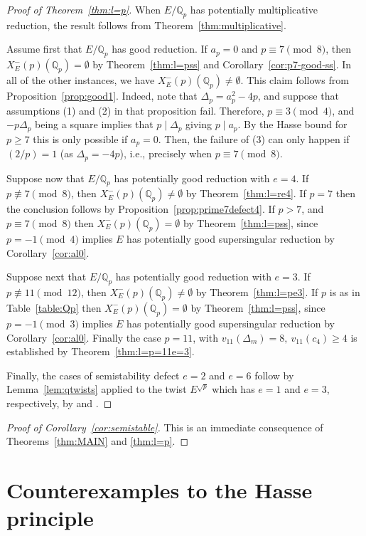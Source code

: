 \documentclass[12pt]{amsart}
\numberwithin{equation}{section}
\theoremstyle{definition}
\newcommand{\Q}{\mathbb{Q}}
\newcommand{\Xp}{X_E^{-}(p)}
\begin{document}
\begin{proof}[Proof of Theorem~\ref{thm:l=p}]
When $E/\Q_p$ has potentially multiplicative reduction, the result follows from Theorem~\ref{thm:multiplicative}. 

Assume first that $E/\Q_p$ has good reduction. If $a_p=0$ and $p \equiv 7\pmod 8$, then $\Xp(\Q_p) = \emptyset$ by Theorem~\ref{thm:l=pss} and Corollary~\ref{cor:p7-good-ss}. 
In all of the other instances, we have $\Xp(\Q_p)\neq \emptyset$.
 This claim follows from Proposition~\ref{prop:good1}. Indeed, note that $\Delta_p=a_p^2-4p$, and suppose that assumptions (1) and (2) in that proposition fail. Therefore, $p\equiv 3 \pmod 4$, and $-p\Delta_p$ being a square implies that $p\mid \Delta_p$ giving $p \mid a_p$. By the Hasse bound for $p\geq 7$ this is only possible if $a_p=0$. Then, the failure of (3) can only happen if $(2/p)=1$ (as $\Delta_p=-4p$), i.e., precisely when $p\equiv7 \pmod 8.$ 
 
 Suppose now that $E/\Q_p$ has potentially good reduction with $e=4$. If $p \not\equiv 7 \pmod 8$, then $\Xp(\Q_p)\neq \emptyset$ by Theorem~\ref{thm:l=re4}. If $p=7$ then the conclusion follows by Proposition~\ref{prop:prime7defect4}. If $p>7$, and $p\equiv 7 \pmod 8$ then $\Xp(\Q_p) = \emptyset$ by Theorem~\ref{thm:l=pss}, since $p=-1\pmod 4$ implies $E$ has potentially good supersingular reduction by Corollary~\ref{cor:al0}. 

Suppose next that $E/\Q_p$ has potentially good reduction with $e=3$. If $p \not \equiv 11 \pmod {12}$, then $\Xp(\Q_p)\neq \emptyset$ by Theorem~\ref{thm:l=pe3}. If $p$ is as in Table~\ref{table:Qp} then $\Xp(\Q_p) = \emptyset$ by Theorem~\ref{thm:l=pss}, since $p=-1\pmod 3$ implies $E$ has potentially good supersingular reduction by Corollary~\ref{cor:al0}. Finally the case $p=11$, with $v_{11}(\Delta_m)=8,\: v_{11}(c_4)\geq4$ is established by Theorem~\ref{thm:l=p=11e=3}.

Finally, the cases of semistability defect $e=2$ and $e=6$ follow by 
Lemma~\ref{lem:qtwists} applied to the twist $E^{\sqrt{p}}$ which has $e=1$ and $e=3$, respectively, by \cite[Lemma 3]{symplectic} and \cite[Lemma 1]{symplectic}.
\end{proof}

\begin{proof}[Proof of Corollary~\ref{cor:semistable}]
This is an immediate consequence of Theorems~\ref{thm:MAIN} and \ref{thm:l=p}.
\end{proof}
\section{Counterexamples to the Hasse principle}
\label{sec:Hasse}
\end{document}
